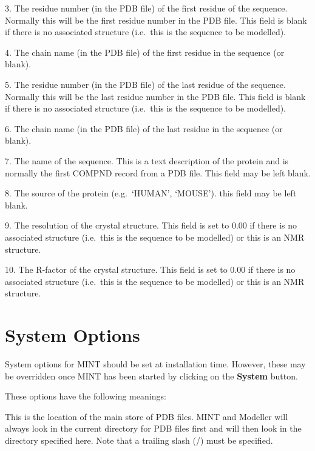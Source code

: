 \documentclass[12pt]{article}
\newcommand{\appsection}[1]{\par\vspace{1ex}\noindent{\bfseries #1}\par\noindent}
\begin{document}
3. The residue number (in the PDB file) of the first residue of the
sequence. Normally this will be the first residue number in the PDB
file. This field is blank if there is no associated structure
(i.e.\ this is the sequence to be modelled).

4. The chain name (in the PDB file) of the first residue in the
sequence (or blank).

5. The residue number (in the PDB file) of the last residue of the
sequence. Normally this will be the last residue number in the PDB
file. This field is blank if there is no associated structure
(i.e.\ this is the sequence to be modelled).

6. The chain name (in the PDB file) of the last residue in the
sequence (or blank).

7. The name of the sequence. This is a text description of the protein
and is normally the first COMPND record from a PDB file. This field
may be left blank.

8. The source of the protein (e.g.\ `HUMAN', `MOUSE'). this field may
be left blank.

9. The resolution of the crystal structure. This field is set to 0.00
if there is no associated structure (i.e.\ this is the sequence to be
modelled) or this is an NMR structure.

10. The R-factor of the crystal structure. This field is set to 0.00
if there is no associated structure (i.e.\ this is the sequence to be
modelled) or this is an NMR structure.









\section{System Options}
\label{app:system}
System options for MINT should be set at installation time. However, these
may be overridden once MINT has been started by clicking on the
{\bfseries System} button.
\vspace{1em}

\noindent These options have the following meanings:

\appsection{PDB Directory}
\noindent This is the location of the main store of PDB files. MINT
and Modeller will always look in the current directory for PDB files
first and will then look in the directory specified here. Note that a
trailing slash (/) must be specified. 
\end{document}
